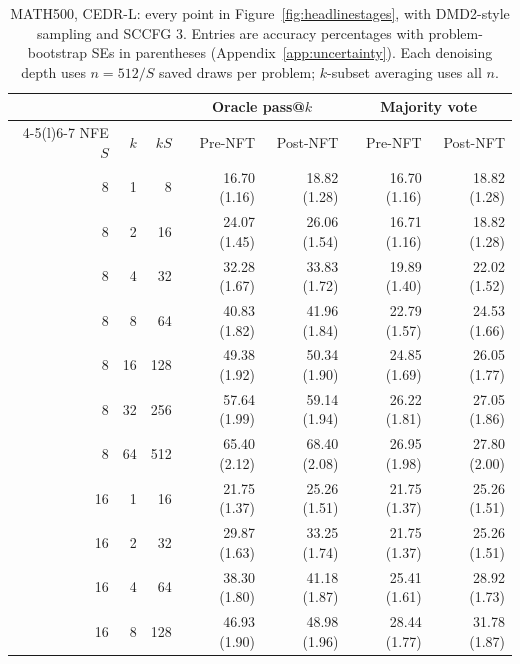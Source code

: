 \documentclass[11pt,letterpaper]{article}
\begin{document}
\begin{table}[!htbp]
\caption{MATH500, CEDR-L: every point in Figure~\ref{fig:headlinestages}, with DMD2-style sampling and SCCFG 3. Entries are accuracy percentages with problem-bootstrap SEs in parentheses (Appendix~\ref{app:uncertainty}). Each denoising depth uses $n=512/S$ saved draws per problem; $k$-subset averaging uses all $n$.}
\label{tab:budgetvaluesmathl}
\centering\small
\setlength{\tabcolsep}{5pt}
\begin{tabular}{@{}rrr rrrr@{}}
\toprule
& & & \multicolumn{2}{c}{Oracle pass@$k$} & \multicolumn{2}{c}{Majority vote} \\
\cmidrule(lr){4-5}\cmidrule(l){6-7}
NFE $S$ & $k$ & $kS$ & Pre-NFT & Post-NFT & Pre-NFT & Post-NFT \\
\midrule
8 & 1 & 8 & 16.70 {\scriptsize (1.16)} & 18.82 {\scriptsize (1.28)} & 16.70 {\scriptsize (1.16)} & 18.82 {\scriptsize (1.28)} \\
8 & 2 & 16 & 24.07 {\scriptsize (1.45)} & 26.06 {\scriptsize (1.54)} & 16.71 {\scriptsize (1.16)} & 18.82 {\scriptsize (1.28)} \\
8 & 4 & 32 & 32.28 {\scriptsize (1.67)} & 33.83 {\scriptsize (1.72)} & 19.89 {\scriptsize (1.40)} & 22.02 {\scriptsize (1.52)} \\
8 & 8 & 64 & 40.83 {\scriptsize (1.82)} & 41.96 {\scriptsize (1.84)} & 22.79 {\scriptsize (1.57)} & 24.53 {\scriptsize (1.66)} \\
8 & 16 & 128 & 49.38 {\scriptsize (1.92)} & 50.34 {\scriptsize (1.90)} & 24.85 {\scriptsize (1.69)} & 26.05 {\scriptsize (1.77)} \\
8 & 32 & 256 & 57.64 {\scriptsize (1.99)} & 59.14 {\scriptsize (1.94)} & 26.22 {\scriptsize (1.81)} & 27.05 {\scriptsize (1.86)} \\
8 & 64 & 512 & 65.40 {\scriptsize (2.12)} & 68.40 {\scriptsize (2.08)} & 26.95 {\scriptsize (1.98)} & 27.80 {\scriptsize (2.00)} \\
\midrule
16 & 1 & 16 & 21.75 {\scriptsize (1.37)} & 25.26 {\scriptsize (1.51)} & 21.75 {\scriptsize (1.37)} & 25.26 {\scriptsize (1.51)} \\
16 & 2 & 32 & 29.87 {\scriptsize (1.63)} & 33.25 {\scriptsize (1.74)} & 21.75 {\scriptsize (1.37)} & 25.26 {\scriptsize (1.51)} \\
16 & 4 & 64 & 38.30 {\scriptsize (1.80)} & 41.18 {\scriptsize (1.87)} & 25.41 {\scriptsize (1.61)} & 28.92 {\scriptsize (1.73)} \\
16 & 8 & 128 & 46.93 {\scriptsize (1.90)} & 48.98 {\scriptsize (1.96)} & 28.44 {\scriptsize (1.77)} & 31.78 {\scriptsize (1.87)} \\

\end{tabular}
\end{table}
\end{document}
